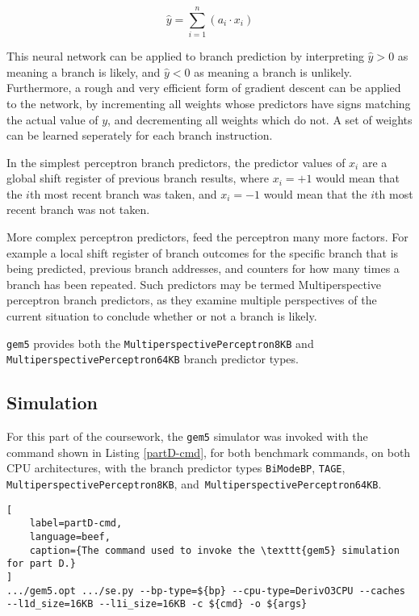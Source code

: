 \begin{equation}
    \hat{y} = \sum_{i=1}^{n} \left( a_i \cdot x_i \right)
    \label{eq:perceptron}
\end{equation}

This neural network can be applied to branch prediction by interpreting
\(\hat{y} > 0\) as meaning a branch is likely, and \(\hat{y} < 0\) as meaning
a branch is unlikely. 
Furthermore, a rough and very efficient form of gradient
descent can be applied to the network, by incrementing all weights whose predictors
have signs matching the actual value of \(y\), and decrementing all weights which
do not. 
A set of weights can be learned seperately for each branch 
instruction.~\cite{Jimenez2001}

In the simplest perceptron branch predictors, the predictor values of \(x_i\)
are a global shift register of previous branch results, where \(x_i = +1\) would
mean that the \(i\)th most recent branch was taken, and \(x_i = -1\) would
mean that the \(i\)th most recent branch was not taken.

More complex perceptron predictors, feed the perceptron many more
factors. For example a local shift register of branch outcomes for the specific
branch that is being predicted, previous branch addresses, and counters for
how many times a branch has been repeated.
Such predictors may be termed
Multiperspective perceptron branch predictors, as they examine multiple
perspectives of the current situation to conclude whether or not a branch
is likely.~\cite{Jimenez2014}

\texttt{gem5} provides both the \texttt{MultiperspectivePerceptron8KB}
and \texttt{MultiperspectivePerceptron64KB} branch predictor types.


\subsection{Simulation}

For this part of the coursework, the \texttt{gem5} simulator was invoked with the
command shown in Listing \ref{partD-cmd},
for both benchmark commands, on both CPU architectures, with the branch
predictor types \texttt{BiModeBP}, \texttt{TAGE},
\texttt{MultiperspectivePerceptron8KB},
and~\texttt{MultiperspectivePerceptron64KB}.


\begin{lstlisting}[
    label=partD-cmd,
    language=beef,
    caption={The command used to invoke the \texttt{gem5} simulation for part D.}
]
.../gem5.opt .../se.py --bp-type=${bp} --cpu-type=DerivO3CPU --caches --l1d_size=16KB --l1i_size=16KB -c ${cmd} -o ${args}
\end{lstlisting}

